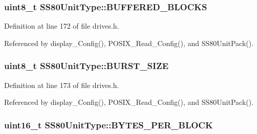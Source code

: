\subsubsection[{\texorpdfstring{B\+U\+F\+F\+E\+R\+E\+D\+\_\+\+B\+L\+O\+C\+KS}{BUFFERED_BLOCKS}}]{\setlength{\rightskip}{0pt plus 5cm}uint8\+\_\+t S\+S80\+Unit\+Type\+::\+B\+U\+F\+F\+E\+R\+E\+D\+\_\+\+B\+L\+O\+C\+KS}\hypertarget{structSS80UnitType_a575a381fe873ba8ba9aa4630673516a4}{}\label{structSS80UnitType_a575a381fe873ba8ba9aa4630673516a4}


Definition at line 172 of file drives.\+h.



Referenced by display\+\_\+\+Config(), P\+O\+S\+I\+X\+\_\+\+Read\+\_\+\+Config(), and S\+S80\+Unit\+Pack().

\subsubsection[{\texorpdfstring{B\+U\+R\+S\+T\+\_\+\+S\+I\+ZE}{BURST_SIZE}}]{\setlength{\rightskip}{0pt plus 5cm}uint8\+\_\+t S\+S80\+Unit\+Type\+::\+B\+U\+R\+S\+T\+\_\+\+S\+I\+ZE}\hypertarget{structSS80UnitType_a4bc66bc02c06dbfe279be6d2af808a04}{}\label{structSS80UnitType_a4bc66bc02c06dbfe279be6d2af808a04}


Definition at line 173 of file drives.\+h.



Referenced by display\+\_\+\+Config(), P\+O\+S\+I\+X\+\_\+\+Read\+\_\+\+Config(), and S\+S80\+Unit\+Pack().

\subsubsection[{\texorpdfstring{B\+Y\+T\+E\+S\+\_\+\+P\+E\+R\+\_\+\+B\+L\+O\+CK}{BYTES_PER_BLOCK}}]{\setlength{\rightskip}{0pt plus 5cm}uint16\+\_\+t S\+S80\+Unit\+Type\+::\+B\+Y\+T\+E\+S\+\_\+\+P\+E\+R\+\_\+\+B\+L\+O\+CK}\hypertarget{structSS80UnitType_a18a5f03be6bea14c6c4a1f9b952bb160}{}\label{structSS80UnitType_a18a5f03be6bea14c6c4a1f9b952bb160}


